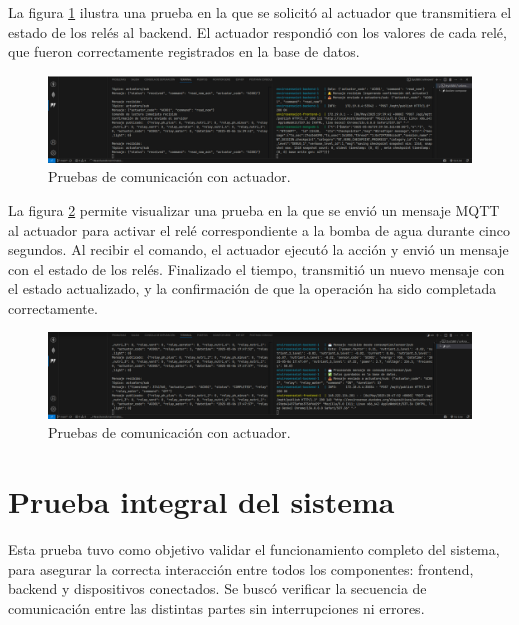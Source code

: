 La figura \ref{fig:prueba_mqtt_actuador_2} ilustra una prueba en la que se
solicitó al actuador que transmitiera el estado de los relés al backend. El
actuador respondió con los valores de cada relé, que fueron correctamente
registrados en la base de datos.

\begin{figure}[H]
    \centering
    \includegraphics[width=\textwidth]{Images/58_prueba_mqtt_actuador_2.png}
    \caption[Pruebas de comunicación con actuador]{Pruebas de comunicación con actuador.}
    \label{fig:prueba_mqtt_actuador_2}
\end{figure}

La figura \ref{fig:prueba_mqtt_actuador_3} permite visualizar una prueba en la
que se envió un mensaje MQTT al actuador para activar el relé correspondiente a
la bomba de agua durante cinco segundos. Al recibir el comando, el actuador
ejecutó la acción y envió un mensaje con el estado de los relés. Finalizado el
tiempo, transmitió un nuevo mensaje con el estado actualizado, y la
confirmación de que la operación ha sido completada correctamente.

\begin{figure}[H]
    \centering
    \includegraphics[width=\textwidth]{Images/58_prueba_mqtt_actuador_3.png}
    \caption[Pruebas de comunicación con actuador]{Pruebas de comunicación con actuador.}
    \label{fig:prueba_mqtt_actuador_3}
\end{figure}

\section{Prueba integral del sistema}

Esta prueba tuvo como objetivo validar el funcionamiento completo del sistema,
para asegurar la correcta interacción entre todos los componentes: frontend,
backend y dispositivos conectados. Se buscó verificar la secuencia de
comunicación entre las distintas partes sin interrupciones ni errores.

